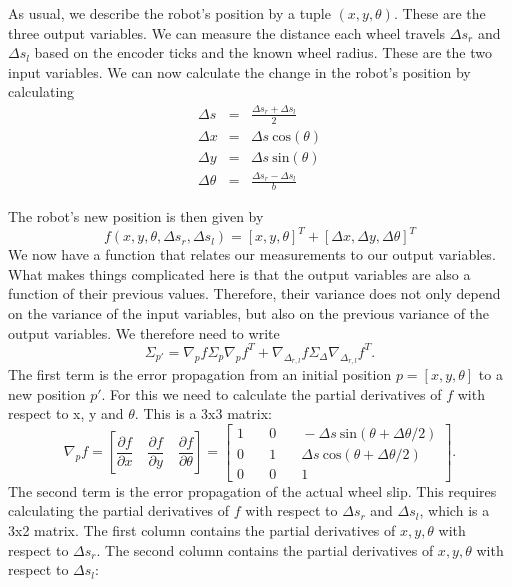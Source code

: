 As usual, we describe the robot's position by a tuple $ (x,y,\theta)$. These are the three output variables. We can measure the distance each wheel travels $ \Delta s_r$ and $ \Delta s_l$ based on the encoder ticks and the known wheel radius. These are the two input variables. We can now calculate the change in the robot's position by calculating
\begin{eqnarray}
\Delta s &=& \frac{\Delta s_r + \Delta s_l}{2}\\
\Delta x  &=& \Delta s~\text{cos}(\theta)\\
\Delta y  &=& \Delta s~\text{sin}(\theta)\\
\Delta \theta &=& \frac{\Delta s_r-\Delta s_l}{b}
\end{eqnarray}

The robot's new position is then given by
\begin{equation}
f(x,y,\theta,\Delta s_r, \Delta s_l)=[x,y,\theta]^T + [\Delta x, \Delta y, \Delta \theta]^T
\end{equation}
We now have a function that relates our measurements to our output variables. What makes things complicated here is that the output variables are also a function of their previous values. Therefore, their variance does not only depend on the variance of the input variables, but also on the previous variance of the output variables. We therefore need to write
\begin{equation}\label{eq:errorpropodom}
\Sigma_{p'}=\nabla_p f \Sigma_p \nabla_p f^T + \nabla_{\Delta_{r,l}}f \Sigma_{\Delta}\nabla_{\Delta_{r,l}}f^T .
\end{equation}
The first term is the error propagation from an initial position $ p=[x,y,\theta]$ to a new position $ p'$. For this we need to calculate the partial derivatives of $ f$ with respect to x, y and $ \theta$. This is a 3x3 matrix:
\begin{equation}
\nabla_p f=\left[\frac{\partial f}{\partial x} \quad \frac{\partial f}{\partial y} \quad \frac{\partial f}{\partial \theta}\right]=\left[\begin{array}{ccc}1 &\quad 0 &\quad -\Delta s~\text{sin}(\theta +\Delta \theta /2)\\0 &\quad 1 &\quad \Delta s~\text{cos}(\theta + \Delta \theta/2)\\0 &\quad 0 &\quad 1\end{array}\right] .
\end{equation}
The second term is the error propagation of the actual wheel slip. This requires calculating the partial derivatives of $ f$ with respect to $ \Delta s_r$ and $ \Delta s_l$, which is a 3x2 matrix. The first column contains the partial derivatives of $ x,y,\theta$ with respect to $ \Delta s_r$. The second column contains the partial derivatives of $ x,y,\theta$ with respect to $ \Delta s_l$:
